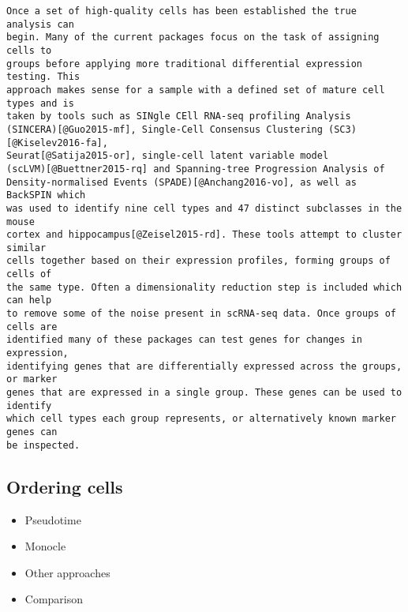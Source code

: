 \documentclass[11pt,a4paper,titlepage,twoside,openright]{style/unimelbthesis}
\theoremstyle{definition}
\theoremstyle{definition}
\theoremstyle{definition}
\theoremstyle{remark}
\begin{document}
\begin{mainmatter}
\begin{verbatim}
Once a set of high-quality cells has been established the true analysis can
begin. Many of the current packages focus on the task of assigning cells to
groups before applying more traditional differential expression testing. This
approach makes sense for a sample with a defined set of mature cell types and is
taken by tools such as SINgle CEll RNA-seq profiling Analysis
(SINCERA)[@Guo2015-mf], Single-Cell Consensus Clustering (SC3)[@Kiselev2016-fa],
Seurat[@Satija2015-or], single-cell latent variable model
(scLVM)[@Buettner2015-rq] and Spanning-tree Progression Analysis of
Density-normalised Events (SPADE)[@Anchang2016-vo], as well as BackSPIN which
was used to identify nine cell types and 47 distinct subclasses in the mouse
cortex and hippocampus[@Zeisel2015-rd]. These tools attempt to cluster similar
cells together based on their expression profiles, forming groups of cells of
the same type. Often a dimensionality reduction step is included which can help
to remove some of the noise present in scRNA-seq data. Once groups of cells are
identified many of these packages can test genes for changes in expression,
identifying genes that are differentially expressed across the groups, or marker
genes that are expressed in a single group. These genes can be used to identify
which cell types each group represents, or alternatively known marker genes can
be inspected.
\end{verbatim}

\hypertarget{ordering-cells}{%
\subsection{Ordering cells}\label{ordering-cells}}

\begin{itemize}
\tightlist
\item
  Pseudotime
\item
  Monocle
\item
  Other approaches
\item
  Comparison
\end{itemize}


\end{mainmatter}
\end{document}
